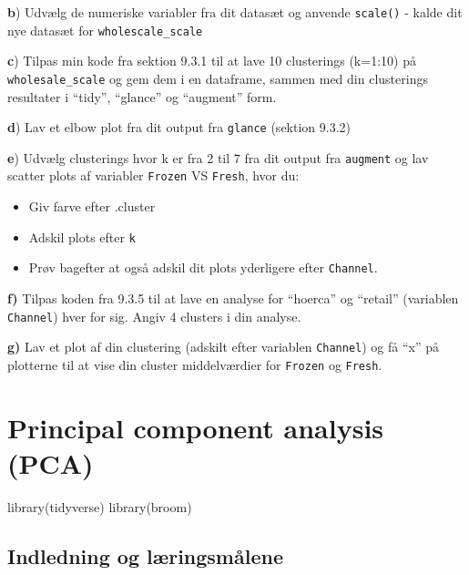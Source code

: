 \documentclass[
]{book}
\newenvironment{Shaded}{\begin{snugshade}}{\end{snugshade}}
\newcommand{\FunctionTok}[1]{\textcolor[rgb]{0.00,0.00,0.00}{#1}}
\newcommand{\NormalTok}[1]{#1}
\providecommand{\tightlist}{%
  \setlength{\itemsep}{0pt}\setlength{\parskip}{0pt}}
\begin{document}
\textbf{b}) Udvælg de numeriske variabler fra dit datasæt og anvende \texttt{scale()} - kalde dit nye datasæt for \texttt{wholescale\_scale}

\textbf{c}) Tilpas min kode fra sektion 9.3.1 til at lave 10 clusterings (k=1:10) på \texttt{wholesale\_scale} og gem dem i en dataframe, sammen med din clusterings resultater i ``tidy'', ``glance'' og ``augment'' form.

\textbf{d}) Lav et elbow plot fra dit output fra \texttt{glance} (sektion 9.3.2)

\textbf{e}) Udvælg clusterings hvor k er fra 2 til 7 fra dit output fra \texttt{augment} og lav scatter plots af variabler \texttt{Frozen} VS \texttt{Fresh}, hvor du:

\begin{itemize}
\tightlist
\item
  Giv farve efter .cluster
\item
  Adskil plots efter \texttt{k}
\item
  Prøv bagefter at også adskil dit plots yderligere efter \texttt{Channel}.
\end{itemize}

\textbf{f)} Tilpas koden fra 9.3.5 til at lave en analyse for ``hoerca'' og ``retail'' (variablen \texttt{Channel}) hver for sig. Angiv 4 clusters i din analyse.

\textbf{g)} Lav et plot af din clustering (adskilt efter variablen \texttt{Channel}) og få ``x'' på plotterne til at vise din cluster middelværdier for \texttt{Frozen} og \texttt{Fresh}.

\hypertarget{principal-component-analysis-pca}{%
\chapter{Principal component analysis (PCA)}\label{principal-component-analysis-pca}}

\begin{Shaded}
\begin{Highlighting}[]
\FunctionTok{library}\NormalTok{(tidyverse)}
\FunctionTok{library}\NormalTok{(broom)}
\end{Highlighting}
\end{Shaded}

\hypertarget{indledning-og-luxe6ringsmuxe5lene-3}{%
\section{Indledning og læringsmålene}\label{indledning-og-luxe6ringsmuxe5lene-3}}
\end{document}
